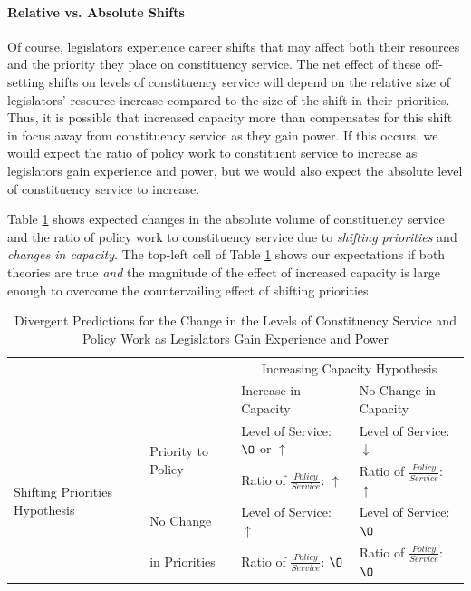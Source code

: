 \documentclass[12pt]{article}
\begin{document}
\paragraph{Relative vs. Absolute Shifts} Of course, legislators experience career shifts that may affect both their resources and the priority they place on constituency service. The net effect of these off-setting shifts on levels of constituency service will depend on the relative size of legislators' resource increase compared to the size of the shift in their priorities. Thus, it is possible that increased capacity more than compensates for this shift in focus away from constituency service as they gain power.
If this occurs, we would expect the ratio of policy work to constituent service to increase as legislators gain experience and power, but we would also expect the absolute level of constituency service to increase.


Table \ref{t:theory} shows expected changes in the absolute volume of constituency service and the ratio of policy work to constituency service due to \textit{shifting priorities} and \textit{changes in capacity}. The top-left cell of Table \ref{t:theory} shows our expectations if both theories are true \textit{and} the magnitude of the effect of increased capacity is large enough to overcome the countervailing effect of shifting priorities.

\begin{table}[]
\caption{Divergent Predictions for the Change in the Levels of Constituency Service and Policy Work as Legislators Gain Experience and Power}\label{t:theory}

\begin{tabular}{p{.15\linewidth}|p{.20\linewidth}|p{.32\linewidth}|p{.33\linewidth}|}
\hline
\multicolumn{2}{l}{\multirow{2}{*}{}} & \multicolumn{2}{|c|}{Increasing Capacity Hypothesis} \\ \cline{3-4}
\multicolumn{2}{l|}{}    &  Increase in Capacity  &   No Change in Capacity \\ \cline{1-4} 
\multirow{4}{1.8cm}{Shifting Priorities Hypothesis}  &   \multirow{2}{2cm}{Priority to Policy}   &  Level of Service: $\O$ or $\uparrow$  &  Level of Service: $\downarrow$  \\ 
& &  Ratio of $\frac{Policy}{Service}$: $\uparrow$   &   Ratio of $\frac{Policy}{Service}$: $\uparrow$  \\ \cline{2-4}
 &  No Change    &  Level of Service: $\uparrow$  & Level of Service: $\O$ \\ 
 & in Priorities &   Ratio of $\frac{Policy}{Service}$: $\O$  & Ratio of $\frac{Policy}{Service}$: $\O$\\ \hline
\end{tabular}
\end{table}
\end{document}
